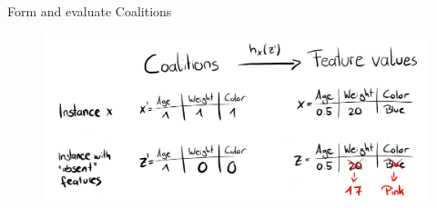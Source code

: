 \documentclass[11pt,compress,t,notes=noshow, aspectratio=169, xcolor=table]{beamer}
\begin{document}
\begin{vbframe}{Form and evaluate Coalitions}

\begin{figure}
    \centering
    \includegraphics{figure_man/molnar-simplified-features.jpg}
\end{figure}

 \end{vbframe}
 
\end{document}
